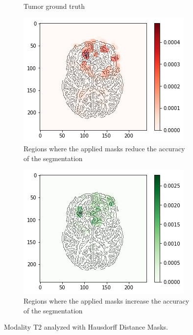 \begin{figure}[H]
\begin{subfigure}[t]{.4\textwidth}
        \caption{Tumor ground truth}
    \end{subfigure}
    \begin{subfigure}[t]{.45\textwidth}
        \centering
        \includegraphics[width=\linewidth]{chapters/06_hdm/c_Brats18_2013_17_1_L1/53.png}
        \caption{Regions where the applied masks reduce the accuracy of the segmentation}
    \end{subfigure}\hspace{1cm}%
    \begin{subfigure}[t]{.45\textwidth}
        \centering
        \includegraphics[width=\linewidth]{chapters/06_hdm/c_Brats18_2013_17_1_L1/54.png}
        \caption{Regions where the applied masks increase the accuracy of the segmentation}
    \end{subfigure}
    \caption{Modality T2 analyzed with Hausdorff Distance Masks. }
    \label{brats_201317_t2}
\end{figure}

